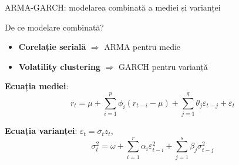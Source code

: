 \documentclass[9pt, aspectratio=169, t]{beamer}
\begin{document}
\begin{frame}{ARMA-GARCH: modelarea combinată a mediei și varianței}
    \small
        \begin{block}{De ce modelare combinată?}
            \begin{itemize}
                \item \textbf{Corelație serială} $\Rightarrow$ ARMA pentru medie
                \item \textbf{Volatility clustering} $\Rightarrow$ GARCH pentru varianță
            \end{itemize}
        \end{block}
        \vspace{-0.1cm}
        \begin{defn}
            \textbf{Ecuația mediei}:
            \vspace{-2mm}
            $$r_t = \mu + \sum_{i=1}^{p} \phi_i (r_{t-i} - \mu) + \sum_{j=1}^{q} \theta_j \varepsilon_{t-j} + \varepsilon_t$$
            \vspace{-2mm}

            \textbf{Ecuația varianței}: $\varepsilon_t = \sigma_t z_t$,
            \vspace{-2mm}
            $$\sigma_t^2 = \omega + \sum_{i=1}^{r} \alpha_i \varepsilon_{t-i}^2 + \sum_{j=1}^{s} \beta_j \sigma_{t-j}^2$$
            \vspace{-2mm}
        \end{defn}
\end{frame}
\end{document}

